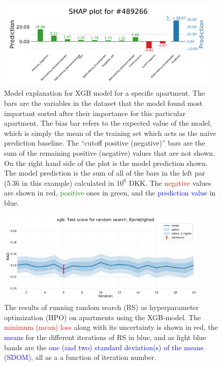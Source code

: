 \documentclass[a4paper, twoside, nobib]{tufte-book}
\newcommand{\q}[1]{``#1''}
\begin{document}
\begin{figure}
  \includegraphics[width=0.95\textwidth, trim=0 0 0 40, clip]{figures/housing/Ejerlejlighed_v18_cut_all_Ncols_all_SHAP_fig_loc=489266.pdf}
  \caption[SHAP Prediction Explanation for apartment]
          {Model explanation for XGB model for a specific apartment. The bars are the variables in the dataset that the model found most important sorted after their importance for this particular apartment. The bias bar refers to the expected value of the model, which is simply the mean of the training set which acts as the naive prediction baseline. The \q{cutoff positive (negative)} bars are the sum of the remaining positive (negative) values that are not shown. On the right hand side of the plot is the model prediction shown. The model prediction is the sum of all of the bars in the left par (5.36 in this example) calculated in $10^6$ DKK. The \textcolor{red}{negative} values are shown in red, \textcolor{green}{positive} ones in green, and the \textcolor{blue}{prediction value} in blue. 
          } 
  \label{fig:h:shap_single_apartment}
\end{figure}


\begin{figure}
  \includegraphics[width=0.9\textwidth, trim=0 0 0 40, clip]{figures/housing/Ejerlejlighed_v18_cut_all_Ncols_all_xgb_score_over_time_random.pdf}
  \caption[Hyperparameter optimization: random search results]
          {The results of running random search (RS) as hyperparameter optimization (HPO) on apartments using the XGB-model. The \textcolor{red}{minimum (mean) loss} along with its uncertainty is shown in red, the \textcolor{blue}{means} for the different iterations of RS in blue, and as light blue bands are the \textcolor{blue}{one (and two) standard deviation(s) of the means (SDOM)}, all as a a function of iteration number.  
          } 
  \label{fig:h:RS_xgb_apartment}
\end{figure}
\end{document}
